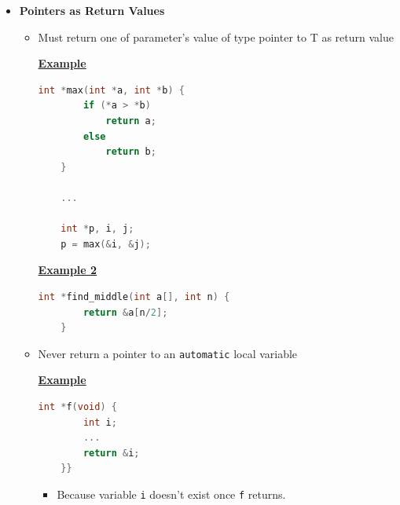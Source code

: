 \documentclass[12pt]{article}
\begin{document}
\begin{enumerate}[1.]
    \begin{itemize}
        \item \textbf{Pointers as Return Values}

        \begin{itemize}
            \item Must return one of parameter's value of type pointer to T as return value

            \bigskip

            \underline{\textbf{Example}}

            \bigskip

\begin{lstlisting}[language=c]
    int *max(int *a, int *b) {
        if (*a > *b)
            return a;
        else
            return b;
    }

    ...

    int *p, i, j;
    p = max(&i, &j);
\end{lstlisting}

            \bigskip

            \underline{\textbf{Example 2}}

            \bigskip

\begin{lstlisting}[language=c]
    int *find_middle(int a[], int n) {
        return &a[n/2];
    }
\end{lstlisting}

            \bigskip

            \item Never return a pointer to an \texttt{automatic} local variable

            \bigskip

            \underline{\textbf{Example}}

            \bigskip


\begin{lstlisting}[language=c]
    int *f(void) {
        int i;
        ...
        return &i;
    }}
\end{lstlisting}

            \bigskip

            \begin{itemize}
                \item Because variable \texttt{i} doesn't exist once \texttt{f} returns.
            \end{itemize}
        \end{itemize}
    \end{itemize}
\end{enumerate}
\end{document}
